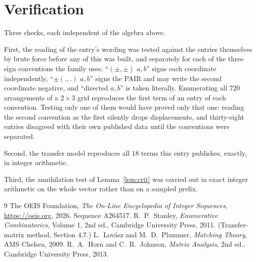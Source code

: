 \documentclass[11pt,a4paper]{article}
\theoremstyle{plain}
\theoremstyle{definition}
\begin{document}
\section{Verification}

Three checks, each independent of the algebra above.

First, the reading of the entry's wording was tested against the entries themselves by brute
force before any of this was built, and separately for each of the three sign conventions the
family uses: ``$(\pm,\pm)$ $a,b$'' signs each coordinate independently, ``$\pm(.,.)$ $a,b$''
signs the PAIR and may write the second coordinate negative, and ``directed $a,b$'' is taken
literally. Enumerating all $720$ arrangements of a $2\times3$ grid reproduces the first term
of an entry of each convention. Testing only one of them would have proved only that one:
reading the second convention as the first silently drops displacements, and thirty-eight
entries disagreed with their own published data until the conventions were separated.

Second, the transfer model reproduces all $18$ terms this entry publishes, exactly, in
integer arithmetic.

Third, the annihilation test of Lemma~\ref{lem:crit} was carried out in exact integer
arithmetic on the whole vector rather than on a sampled prefix.

\begin{thebibliography}{9}
 The OEIS Foundation, \emph{The On-Line Encyclopedia of Integer
Sequences}, \url{https://oeis.org}, 2026. Sequence A264517.
 R.~P.~Stanley, \emph{Enumerative Combinatorics}, Volume 1, 2nd ed.,
Cambridge University Press, 2011. (Transfer-matrix method, Section 4.7.)
 L.~Lov\'asz and M.~D.~Plummer, \emph{Matching Theory}, AMS Chelsea, 2009.
 R.~A.~Horn and C.~R.~Johnson, \emph{Matrix Analysis}, 2nd ed., Cambridge
University Press, 2013.
\end{thebibliography}
\end{document}
